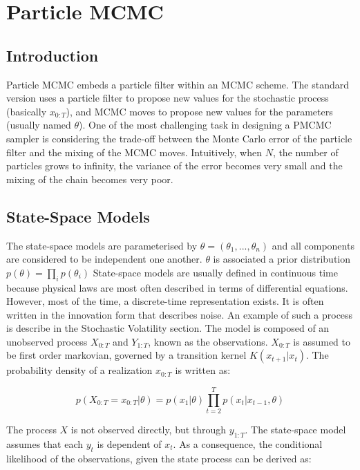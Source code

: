 \documentclass[11pt,a4,twosided,singlespacing,titlepagenumber=on]{scrreprt}
\numberwithin{equation}{chapter} %
\theoremstyle{remark}
\begin{document}
\chapter{Particle MCMC}

\section{Introduction}
Particle MCMC embeds a particle filter within an MCMC scheme. The standard version uses a particle filter to propose new values for the stochastic process (basically $x_{0:T}$), and MCMC moves to propose new values for the parameters (usually named $\theta$). One of the most challenging task in designing a PMCMC sampler is considering the trade-off between the Monte Carlo error of the particle filter and the mixing of the MCMC moves. Intuitively, when $N$, the number of particles grows to infinity, the variance of the error becomes very small and the mixing of the chain becomes very poor.

\section{State-Space Models}
The state-space models are parameterised by $\theta = (\theta_1,...,\theta_n)$ and all components are considered to be independent one another. $\theta$ is associated a prior distribution $p(\theta) = \prod_i p(\theta_i)$ State-space models are usually defined in continuous time because physical laws are most often described in terms of differential equations. However, most of the time, a discrete-time representation exists. It is often written in the innovation form that describes noise. An example of such a process is describe in the Stochastic Volatility section. The model is composed of an unobserved process $X_{0:T}$ and $Y_{1:T}$, known as the observations. $X_{0:T}$ is assumed to be first order markovian, governed by a transition kernel $K(x_{t+1}|x_t)$. The probability density of a realization $x_{0:T}$ is written as:

$$p(X_{0:T} = x_{0:T} | \theta) = p(x_1|\theta) \prod_{t=2}^T p(x_t|x_{t-1}, \theta) $$

The process $X$ is not observed directly, but through $y_{1:T}$. The state-space model assumes that each $y_t$ is dependent of $x_t$. As a consequence, the conditional likelihood of the observations, given the state process can be derived as:
\end{document}
